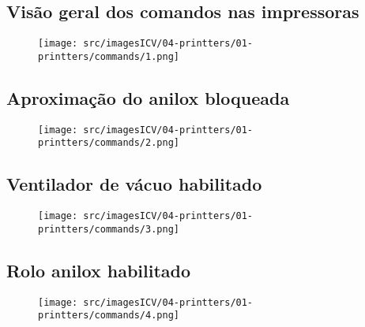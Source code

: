\thispagestyle{fancy}
\vspace*{40 pt}
\subsection{Visão geral dos comandos nas impressoras}
\vspace*{\fill}
\begin{figure}[h]
    \centering
    \texttt{[image: src/imagesICV/04-printters/01-printters/commands/1.png]}
\end{figure}
\vspace*{\fill}

\newpage
\thispagestyle{fancy}
\vspace*{40 pt}
\subsection{Aproximação do anilox bloqueada}
\vspace*{\fill}
\begin{figure}[h]
    \centering
    \texttt{[image: src/imagesICV/04-printters/01-printters/commands/2.png]}
\end{figure}
\vspace*{\fill}

\newpage
\thispagestyle{fancy}
\vspace*{40 pt}
\subsection{Ventilador de vácuo habilitado}
\vspace*{\fill}
\begin{figure}[h]
    \centering
    \texttt{[image: src/imagesICV/04-printters/01-printters/commands/3.png]}
\end{figure}
\vspace*{\fill}

\newpage
\thispagestyle{fancy}
\vspace*{40 pt}
\subsection{Rolo anilox habilitado}
\vspace*{\fill}
\begin{figure}[h]
    \centering
    \texttt{[image: src/imagesICV/04-printters/01-printters/commands/4.png]}
\end{figure}
\vspace*{\fill}

